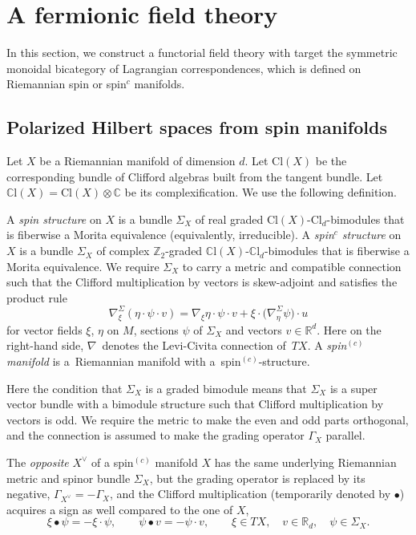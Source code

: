 \documentclass[10pt,a4paper]{amsart}
\numberwithin{equation}{section}
\newcommand{\R}{\mathbb{R}}
\newcommand{\Z}{\mathbb{Z}}
\newcommand{\C}{\mathbb{C}}
\newcommand{\Cl}{\mathrm{Cl}}
\newcommand{\CCl}{\mathbb{C}\mathrm{l}}
\begin{document}
\section{A fermionic field theory}
\label{SectionFieldTheorySUP}

In this section, we construct a functorial field theory with target the symmetric monoidal bicategory of Lagrangian correspondences, which is defined on Riemannian spin or spin$^c$ manifolds.


\subsection{Polarized Hilbert spaces from spin manifolds}
Let $X$ be a Riemannian manifold of dimension $d$.
Let $\Cl(X)$ be the corresponding bundle of Clifford algebras built from the tangent bundle.
Let $\CCl(X) = \Cl(X) \otimes \C$ be its complexification.
We use the following definition.

\begin{Definition} \label{DefinitionSpinStructure}
 A \emph{spin structure} on $X$ is a bundle $\Sigma_X$ of real graded $\Cl(X)$-$\Cl_d$-bimodules that is fiberwise a Morita equivalence (equivalently, irreducible).
 A \emph{spin$^c$ structure} on $X$ is a bundle $\Sigma_X$ of complex $\Z_2$-graded $\CCl(X)$-$\CCl_d$-bimodules that is fiberwise a Morita equivalence.
 We require $\Sigma_X$ to carry a metric and compatible connection such that the Clifford multiplication by vectors is skew-adjoint and satisfies the product rule
 \begin{equation*}
 \nabla^\Sigma_\xi(\eta \cdot \psi \cdot v) = \nabla_\xi \eta \cdot \psi \cdot v + \xi \cdot \big(\nabla_\eta^\Sigma \psi\big) \cdot u
 \end{equation*}
 for vector fields $\xi$, $\eta$ on $M$, sections $\psi$ of $\Sigma_X$ and vectors $v \in \R^d$.
 Here on the right-hand side, $\nabla$~denotes the Levi-Civita connection of~$TX$.
 A \emph{spin$^{(c)}$ manifold} is a~Riemannian manifold with a~spin$^{(c)}$-structure.
\end{Definition}

Here the condition that $\Sigma_X$ is a graded bimodule means that $\Sigma_X$ is a super vector bundle with a bimodule structure such that Clifford multiplication by vectors is odd.
We require the metric to make the even and odd parts orthogonal, and the connection is assumed to make the grading operator $\Gamma_X$ parallel.

\begin{Definition}[opposite]
The \emph{opposite} $X^\vee$ of a spin$^{(c)}$ manifold $X$ has the same underlying Riemannian metric and spinor bundle $\Sigma_X$, but the grading operator is replaced by its negative, $\Gamma_{X^\vee} = - \Gamma_X$, and the Clifford multiplication (temporarily denoted by $\bullet$) acquires a sign as well compared to the one of $X$,
\begin{equation*}
 \xi \bullet \psi = - \xi \cdot \psi, \qquad \psi \bullet v = - \psi \cdot v, \qquad \xi \in TX, \quad v \in \R_d, \quad\psi \in \Sigma_X.
\end{equation*}
\end{Definition}
\end{document}
